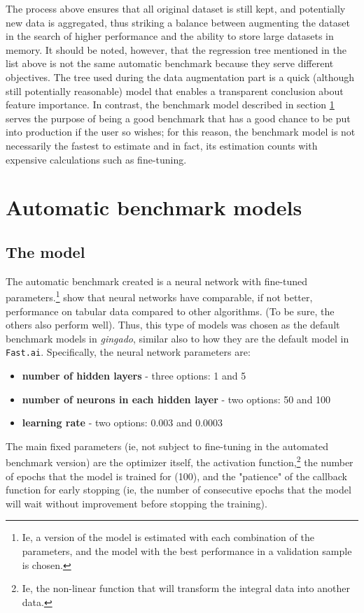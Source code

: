 \documentclass{article}
\begin{document}
The process above ensures that all original dataset is still kept, and potentially new data is aggregated, thus striking a balance between augmenting the dataset in the search of higher performance and the ability to store large datasets in memory. It should be noted, however, that the regression tree mentioned in the list above is not the same automatic benchmark because they serve different objectives. The tree used during the data augmentation part is a quick (although still potentially reasonable) model that enables a transparent conclusion about feature importance. In contrast, the benchmark model described in section \ref{benchmark} serves the purpose of being a good benchmark that has a good chance to be put into production if the user so wishes; for this reason, the benchmark model is not necessarily the fastest to estimate and in fact, its estimation counts with expensive calculations such as fine-tuning.

\section{Automatic benchmark models}\label{benchmark}

\subsection{The model}
The automatic benchmark created is a neural network with fine-tuned parameters.\footnote{Ie, a version of the model is estimated with each combination of the parameters, and the model with the best performance in a validation sample is chosen.} \cite{TabularDeepLearning} show that neural networks have comparable, if not better, performance on tabular data compared to other algorithms. (To be sure, the others also perform well). Thus, this type of models was chosen as the default benchmark models in \textit{gingado}, similar also to how they are the default model in \texttt{Fast.ai}. Specifically, the neural network parameters are:

\begin{itemize}
    \item \textbf{number of hidden layers} - three options: 1 and 5
    \item \textbf{number of neurons in each hidden layer} - two options: 50 and 100
    \item \textbf{learning rate} - two options: 0.003 and 0.0003
\end{itemize}

The main fixed parameters (ie, not subject to fine-tuning in the automated benchmark version) are the optimizer itself, the activation function,\footnote{Ie, the non-linear function that will transform the integral data into another data.} the number of epochs that the model is trained for (100), and the "patience"  of the callback function for early stopping (ie, the number of consecutive epochs that the model will wait without improvement before stopping the training).
\end{document}
